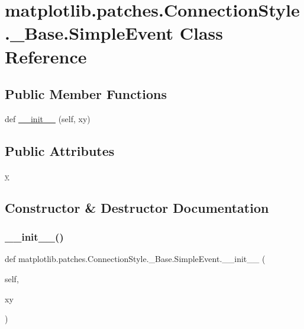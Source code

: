 \hypertarget{classmatplotlib_1_1patches_1_1ConnectionStyle_1_1__Base_1_1SimpleEvent}{}\section{matplotlib.\+patches.\+Connection\+Style.\+\_\+\+Base.\+Simple\+Event Class Reference}
\label{classmatplotlib_1_1patches_1_1ConnectionStyle_1_1__Base_1_1SimpleEvent}
\subsection*{Public Member Functions}
\begin{DoxyCompactItemize}
\item 
def \hyperlink{classmatplotlib_1_1patches_1_1ConnectionStyle_1_1__Base_1_1SimpleEvent_ae6a519bdb6359d0ec634b75f0a284e9d}{\+\_\+\+\_\+init\+\_\+\+\_\+} (self, xy)
\end{DoxyCompactItemize}
\subsection*{Public Attributes}
\begin{DoxyCompactItemize}
\item 
\hyperlink{classmatplotlib_1_1patches_1_1ConnectionStyle_1_1__Base_1_1SimpleEvent_a113d09041bb32a049f0b7a47e20e4764}{y}
\end{DoxyCompactItemize}


\subsection{Constructor \& Destructor Documentation}
\mbox{\label{classmatplotlib_1_1patches_1_1ConnectionStyle_1_1__Base_1_1SimpleEvent_ae6a519bdb6359d0ec634b75f0a284e9d}} 
\subsubsection{\texorpdfstring{\+\_\+\+\_\+init\+\_\+\+\_\+()}{\_\_init\_\_()}}
{\footnotesize\ttfamily def matplotlib.\+patches.\+Connection\+Style.\+\_\+\+Base.\+Simple\+Event.\+\_\+\+\_\+init\+\_\+\+\_\+ (\begin{DoxyParamCaption}\item[{}]{self,  }\item[{}]{xy }\end{DoxyParamCaption})}



